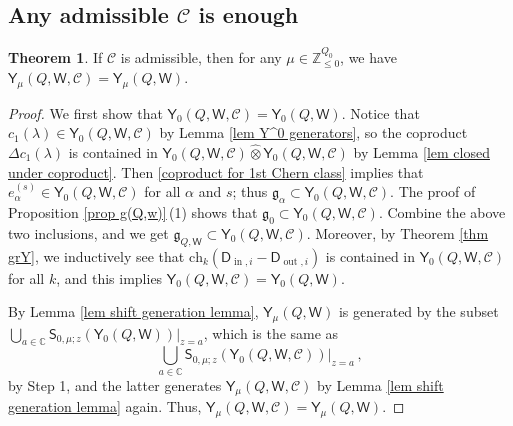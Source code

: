 \documentclass[10pt]{amsart}
\theoremstyle{definition}
\newtheorem{Theorem}{Theorem}[section]
\numberwithin{equation}{section}
\newcommand{\bC}{\mathbb{C}}
\newcommand{\bZ}{\mathbb{Z}}
\newcommand{\sS}{\mathsf{S}}
\newcommand{\sW}{\mathsf{W}}
\newcommand{\In}{\operatorname{in}}
\newcommand{\Out}{\operatorname{out}}
\begin{document}





\subsection{Any admissible \texorpdfstring{$\mathcal C$}{C} is enough}\label{sec Y(Q,C)=Y(Q,w)}

\begin{Theorem}
\label{thm admissible}
If $\mathcal C$ is admissible, then for any $\mu\in \bZ_{\leqslant 0}^{Q_0}$, we have $\mathsf Y_\mu(Q,\sW,\mathcal C)=\mathsf Y_\mu(Q,\sW)$.
\end{Theorem}

\begin{proof}
We first show that $\mathsf Y_0(Q,\sW,\mathcal C)=\mathsf Y_0(Q,\sW)$. Notice that $c_1(\lambda)\in \mathsf Y_0(Q,\sW,\mathcal C)$ by Lemma \ref{lem Y^0 generators}, so the coproduct $\Delta c_1(\lambda)$ is contained in $\mathsf Y_0(Q,\sW,\mathcal C)\widehat{\otimes} \mathsf Y_0(Q,\sW,\mathcal C)$ by Lemma \ref{lem closed under coproduct}. Then \eqref{coproduct for 1st Chern class} implies that $e_{\alpha}^{(s)}\in \mathsf Y_0(Q,\sW,\mathcal C)$ for all $\alpha$ and $s$; thus $\mathfrak{g}_\alpha\subset \mathsf Y_0(Q,\sW,\mathcal C)$. The proof of Proposition \ref{prop g(Q,w)}\,(1) shows that $\mathfrak{g}_0\subset \mathsf Y_0(Q,\sW,\mathcal C)$. Combine the above two inclusions, and we get $\mathfrak{g}_{Q,\sW}\subset \mathsf Y_0(Q,\sW,\mathcal C)$. Moreover, by Theorem \ref{thm grY}, we inductively see that $\mathrm{ch}_{k}(\mathsf D_{\In,i}-\mathsf D_{\Out,i})$ is contained in $\mathsf Y_0(Q,\sW,\mathcal C)$ for all $k$, and this implies $\mathsf Y_0(Q,\sW,\mathcal C)=\mathsf Y_0(Q,\sW)$.


By Lemma \ref{lem shift generation lemma}, $\mathsf Y_\mu(Q,\sW)$ is generated by the subset $\bigcup_{a\in \bC}\sS_{0,\mu;z}(\mathsf Y_{0}(Q,\sW))\big|_{z=a}$, which is the same as $$\bigcup_{a\in \bC}\sS_{0,\mu;z}(\mathsf Y_{0}(Q,\sW,\mathcal C))\big|_{z=a}\,,$$ by Step 1, and the latter generates $\mathsf Y_\mu(Q,\sW,\mathcal C)$ by Lemma \ref{lem shift generation lemma} again. Thus, $\mathsf Y_\mu(Q,\sW,\mathcal C)=\mathsf Y_\mu(Q,\sW)$.
\end{proof}
\end{document}
